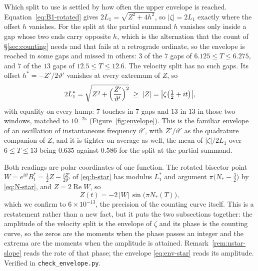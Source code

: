 \documentclass[11pt]{article}
\theoremstyle{definition}
\begin{document}
Which split to use is settled by how often the upper envelope is reached.
Equation~\eqref{eq:B1-rotated} gives $2L_1=\sqrt{Z^2+4h^2}$, so $|\zeta|=2L_1$
exactly where the offset $h$ vanishes. For the split at the partial
summand $h$ vanishes only inside a gap whose two ends carry opposite $h$, which
is the alternation that the count of \S\ref{sec:counting} needs and that fails at
a retrograde ordinate, so the envelope is reached in some gaps and missed in
others: $3$ of the $7$ gaps of $6.125\leq T\leq6.275$, and $7$ of the $13$ gaps
of $12.5\leq T\leq12.6$. The velocity split has no such gaps. Its offset
$h^{\ast}=-Z'/2\vartheta'$ vanishes at every extremum of $Z$, so
\begin{equation}\label{eq:env-star}
2L_1^{\ast}=\sqrt{Z^2+\Bigl(\frac{Z'}{\vartheta'}\Bigr)^{2}}
\;\geq\;|Z|=\bigl|\zeta\bigl(\tfrac12+it\bigr)\bigr| ,
\end{equation}
with equality on every hump: $7$ touches in $7$ gaps and $13$ in $13$ in those
two windows, matched to $10^{-25}$ (Figure~\ref{fig:envelope}). This is the familiar envelope of an
oscillation of instantaneous frequency $\vartheta'$, with $Z'/\vartheta'$ as the
quadrature companion of $Z$, and it is tighter on average as well, the mean of
$|\zeta|/2L_1$ over $6\leq T\leq13$ being $0.635$ against $0.586$ for the split
at the partial summand.

Both readings are polar coordinates of one function. The rotated bisector point
$W=e^{i\vartheta}B_1^{\ast}=\tfrac12Z-\tfrac{iZ'}{2\vartheta'}$ of \eqref{eq:h-star}
has modulus $L_1^{\ast}$ and argument $\pi\bigl(N_{\ast}-\tfrac32\bigr)$ by
\eqref{eq:N-star}, and $Z=2\operatorname{Re}W$, so
\begin{equation}\label{eq:Z-polar}
Z(t)=-2\,|W|\,\sin\bigl(\pi N_{\ast}(T)\bigr),
\end{equation}
which we confirm to $6\times10^{-13}$, the precision of the counting curve
itself. This is a restatement rather than a new fact, but it puts the two
subsections together: the amplitude of the velocity split is the envelope of
$\zeta$ and its phase is the counting curve, so the zeros are the moments when
the phase passes an integer and the extrema are the moments when the amplitude
is attained. Remark~\ref{rem:nstar-slope} reads the rate of that phase; the
envelope \eqref{eq:env-star} reads its amplitude. Verified in
\texttt{check\_envelope.py}.
\end{document}
